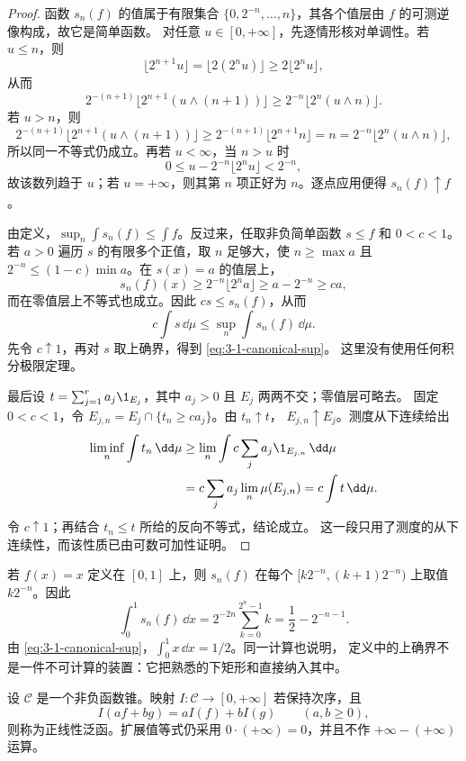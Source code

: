 \begin{proof}
函数 $s_n(f)$ 的值属于有限集合
$\{0,2^{-n},\ldots,n\}$，其各个值层由 $f$ 的可测逆像构成，故它是简单函数。
对任意 $u\in[0,+\infty]$，先逐情形核对单调性。若 $u\le n$，则
\[
 \lfloor2^{n+1}u\rfloor=\lfloor2(2^nu)\rfloor
 \ge 2\lfloor2^nu\rfloor,
\]
从而
\[
 2^{-(n+1)}\lfloor2^{n+1}(u\wedge(n+1))\rfloor
 \ge 2^{-n}\lfloor2^n(u\wedge n)\rfloor.
\]
若 $u>n$，则
\[
 2^{-(n+1)}\lfloor2^{n+1}(u\wedge(n+1))\rfloor
 \ge 2^{-(n+1)}\lfloor2^{n+1}n\rfloor=n
 =2^{-n}\lfloor2^n(u\wedge n)\rfloor,
\]
所以同一不等式仍成立。再若 $u<\infty$，当 $n>u$ 时
\[
 0\le u-2^{-n}\lfloor2^nu\rfloor<2^{-n},
\]
故该数列趋于 $u$；若 $u=+\infty$，则其第 $n$ 项正好为 $n$。逐点应用便得
$s_n(f)\uparrow f$。

由定义，$\sup_n\int s_n(f)\leq\int f$。反过来，任取非负简单函数 $s\leq f$ 和
$0<c<1$。若 $a>0$ 遍历 $s$ 的有限多个正值，取 $n$ 足够大，使
$n\geq\max a$ 且 $2^{-n}\leq(1-c)\min a$。在 $s(x)=a$ 的值层上，
\[
 s_n(f)(x)\geq2^{-n}\lfloor2^na\rfloor\geq a-2^{-n}\geq ca,
\]
而在零值层上不等式也成立。因此 $cs\leq s_n(f)$，从而
\[
 c\int s\,\dd\mu\leq\sup_n\int s_n(f)\,\dd\mu.
\]
先令 $c\uparrow1$，再对 $s$ 取上确界，得到 \eqref{eq:3-1-canonical-sup}。
这里没有使用任何积分极限定理。

最后设 $t=\sum_{j=1}^r a_j\1_{E_j}$，其中 $a_j>0$ 且 $E_j$ 两两不交；零值层可略去。
固定 $0<c<1$，令 $E_{j,n}=E_j\cap\{t_n\geq ca_j\}$。由 $t_n\uparrow t$，
$E_{j,n}\uparrow E_j$。测度从下连续给出
\[
 \begin{aligned}
 \liminf_n\int t_n\,\dd\mu
 &\geq \lim_n\int c\sum_j a_j\1_{E_{j,n}}\,\dd\mu\\
 &=c\sum_j a_j\lim_n\mu(E_{j,n})
 =c\int t\,\dd\mu.
 \end{aligned}
\]
令 $c\uparrow1$；再结合 $t_n\leq t$ 所给的反向不等式，结论成立。
这一段只用了测度的从下连续性，而该性质已由可数可加性证明。
\end{proof}

\begin{example}[层级阶梯]\label{ex:3-1-1-3}
若 $f(x)=x$ 定义在 $[0,1]$ 上，则 $s_n(f)$ 在每个
$[k2^{-n},(k+1)2^{-n})$ 上取值 $k2^{-n}$。因此
\[
 \int_0^1s_n(f)\,\dd x
 =2^{-2n}\sum_{k=0}^{2^n-1}k
 =\frac12-2^{-n-1}.
\]
由 \eqref{eq:3-1-canonical-sup}，$\int_0^1x\,\dd x=1/2$。同一计算也说明，
定义中的上确界不是一件不可计算的装置：它把熟悉的下矩形和直接纳入其中。
\end{example}

\begin{definition}[正线性泛函]\label{def:3-1-1-3}
设 $\mathcal C$ 是一个非负函数锥。映射 $I:\mathcal C\to[0,+\infty]$ 若保持次序，且
\[
 I(af+bg)=aI(f)+bI(g)\qquad(a,b\geq0),
\]
则称为正线性泛函。扩展值等式仍采用 $0\cdot(+\infty)=0$，并且不作
$+\infty-(+\infty)$ 运算。
\end{definition}


